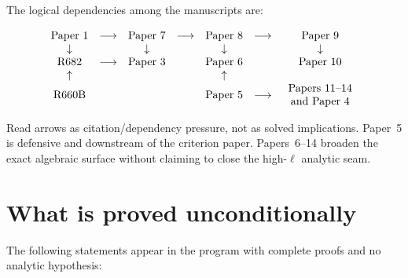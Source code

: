 \documentclass[11pt]{article}
\newcommand{\1}{\mathbf 1}
\begin{document}
The logical dependencies among the manuscripts are:

\[
\begin{array}{c@{\quad}c@{\quad}c@{\quad}c@{\quad}c@{\quad}c@{\quad}c}
\text{Paper 1} & \longrightarrow & \text{Paper 7} & \longrightarrow & \text{Paper 8} & \longrightarrow & \text{Paper 9} \\
\downarrow & & \downarrow & & \downarrow & & \downarrow \\
\text{R682} & \longrightarrow & \text{Paper 3} & & \text{Paper 6} & & \text{Paper 10} \\
\uparrow & & & & \uparrow & & \\
\text{R660B} & & & & \text{Paper 5} & \longrightarrow & \begin{array}{c}\text{Papers 11--14}\\ \text{and Paper 4}\end{array}
\end{array}
\]

Read arrows as citation/dependency pressure, not as solved implications.  Paper~5 is defensive and downstream of the criterion paper.  Papers~6--14 broaden the exact algebraic surface without claiming to close the high-\(\ell\) analytic seam.

\section{What is proved unconditionally}

The following statements appear in the program with complete proofs and no analytic hypothesis:
\end{document}
